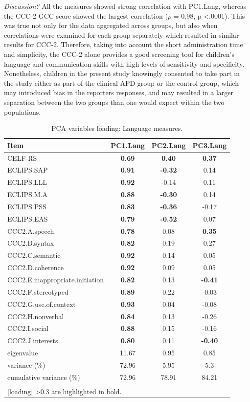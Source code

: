 \documentclass[a4paper, twoside]{templates/ociamthesis}
\begin{document}
\emph{Discussion?}
All the measures showed strong correlation with PC1.Lang, whereas the CCC-2 GCC score showed the largest correlation (\(\rho\) = 0.98, p \textless.0001). This was true not only for the data aggregated across groups, but also when correlations were examined for each group separately which resulted in similar results for CCC-2. Therefore, taking into account the short administration time and simplicity, the CCC-2 alone provides a good screening tool for children's language and communication skills with high levels of sensitivity and specificity. Nonetheless, children in the present study knowingly consented to take part in the study either as part of the clinical APD group or the control group, which may introduced bias in the reporters responses, and may resulted in a larger separation between the two groups than one would expect within the two populations.

\begin{table}

\caption{\label{tab:PCALang-Tab}PCA variables loading: Language measures.}
\centering
\begin{tabular}[t]{lccc}
\toprule
Item & PC1.Lang & PC2.Lang & PC3.Lang\\
\midrule
CELF-RS & \textbf{0.69} & \textbf{0.40} & \textbf{0.37}\\
ECLIPS.SAP & \textbf{0.91} & \textbf{-0.32} & 0.14\\
ECLIPS.LLL & \textbf{0.92} & -0.14 & 0.11\\
ECLIPS.M.A & \textbf{0.88} & \textbf{-0.30} & 0.14\\
ECLIPS.PSS & \textbf{0.83} & \textbf{-0.36} & -0.17\\
ECLIPS.EAS & \textbf{0.79} & \textbf{-0.52} & 0.07\\
CCC2.A.speech & \textbf{0.78} & 0.08 & \textbf{0.35}\\
CCC2.B.syntax & \textbf{0.82} & 0.19 & 0.27\\
CCC2.C.semantic & \textbf{0.92} & 0.14 & 0.05\\
CCC2.D.coherence & \textbf{0.92} & 0.09 & 0.05\\
CCC2.E.inappropriate.initiation & \textbf{0.82} & 0.13 & \textbf{-0.41}\\
CCC2.F.stereotyped & \textbf{0.89} & 0.22 & -0.03\\
CCC2.G.use.of.context & \textbf{0.93} & 0.04 & -0.08\\
CCC2.H.nonverbal & \textbf{0.84} & 0.13 & -0.26\\
CCC2.I.social & \textbf{0.88} & 0.15 & -0.16\\
CCC2.J.interests & \textbf{0.80} & 0.11 & \textbf{-0.40}\\
\midrule
eigenvalue & 11.67 & 0.95 & 0.85\\
variance (\%) & 72.96 & 5.95 & 5.3\\
cumulative variance (\%) & 72.96 & 78.91 & 84.21\\
\bottomrule
\multicolumn{4}{l}{\textsuperscript{} |loading| >0.3 are highlighted in bold.}\\
\end{tabular}
\end{table}
\end{document}
